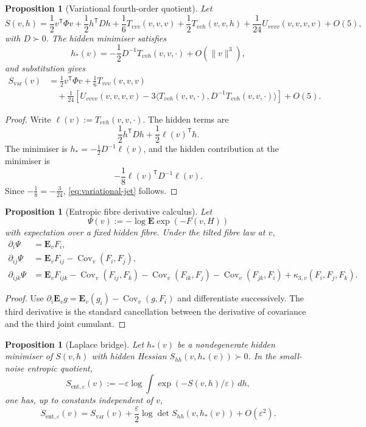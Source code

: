 \documentclass[11pt,a4paper]{article}
\numberwithin{equation}{section}
\DeclareMathOperator{\Cov}{Cov}
\newcommand{\E}{\mathbf E}
\theoremstyle{thmcompact}
\newtheorem{proposition}[theorem]{Proposition}
\theoremstyle{remark}
\begin{document}
\begin{proposition}[Variational fourth-order quotient]
\label{prop:variational-jet}
Let
\[
S(v,h)=
\frac12v^{\mathsf T}\Phi v+\frac12h^{\mathsf T}Dh
+\frac16T_{vvv}(v,v,v)
+\frac12T_{vvh}(v,v,h)
+\frac1{24}U_{vvvv}(v,v,v,v)
+O(5),
\]
with $D\succ0$. The hidden minimiser satisfies
\[
h_*(v)=-\frac12D^{-1}T_{vvh}(v,v,\cdot)+O(\|v\|^3),
\]
and substitution gives
\begin{equation}
\begin{aligned}
S_{\mathrm{var}}(v)
&=
\frac12v^{\mathsf T}\Phi v+\frac16T_{vvv}(v,v,v)\\
&\quad+\frac1{24}\left[
U_{vvvv}(v,v,v,v)
-3\langle T_{vvh}(v,v,\cdot),D^{-1}T_{vvh}(v,v,\cdot)\rangle
\right]+O(5).
\end{aligned}
\label{eq:variational-jet}
\end{equation}
\end{proposition}

\begin{proof}
Write $\ell(v):=T_{vvh}(v,v,\cdot)$. The hidden terms are
\[
\frac12h^{\mathsf T}Dh+\frac12\ell(v)^{\mathsf T}h.
\]
The minimiser is $h_*=-\frac12D^{-1}\ell(v)$, and the hidden contribution at the minimiser is
\[
-\frac18\ell(v)^{\mathsf T}D^{-1}\ell(v).
\]
Since $-\frac18=-\frac3{24}$, \eqref{eq:variational-jet} follows.
\end{proof}

\begin{proposition}[Entropic fibre derivative calculus]
\label{prop:entropic-derivatives}
Let
\[
\Psi(v):=-\log \E\exp(-F(v,H))
\]
with expectation over a fixed hidden fibre. Under the tilted fibre law at $v$,
\begin{align}
\partial_i\Psi&=\E_vF_i,\\
\partial_{ij}\Psi&=\E_vF_{ij}-\Cov_v(F_i,F_j),\\
\partial_{ijk}\Psi
&=\E_vF_{ijk}
-\Cov_v(F_{ij},F_k)-\Cov_v(F_{ik},F_j)-\Cov_v(F_{jk},F_i)
+\kappa_{3,v}(F_i,F_j,F_k).
\end{align}
\end{proposition}

\begin{proof}
Use $\partial_i\E_v g=\E_v(g_i)-\Cov_v(g,F_i)$ and differentiate successively. The third derivative is the standard cancellation between the derivative of covariance and the third joint cumulant.
\end{proof}

\begin{proposition}[Laplace bridge]
\label{prop:laplace-bridge}
Let $h_*(v)$ be a nondegenerate hidden minimiser of $S(v,h)$ with hidden Hessian $S_{hh}(v,h_*(v))\succ0$. In the small-noise entropic quotient,
\[
S_{\mathrm{ent},\varepsilon}(v):=-\varepsilon\log\int \exp(-S(v,h)/\varepsilon)\,dh,
\]
one has, up to constants independent of $v$,
\begin{equation}
S_{\mathrm{ent},\varepsilon}(v)
=S_{\mathrm{var}}(v)
+\frac{\varepsilon}{2}\log\det S_{hh}(v,h_*(v))
+O(\varepsilon^2).
\label{eq:laplace-bridge}
\end{equation}
\end{proposition}
\end{document}
